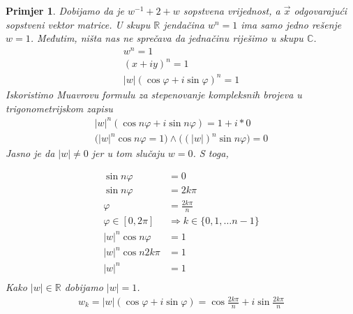 \documentclass[11pt]{article}
\newtheorem{example}{Primjer}
\begin{document}
\begin{example}
	Dobijamo da je $w^{-1} + 2 + w$ sopstvena vrijednost, a $\vec{x}$ odgovarajući sopstveni vektor matrice.
	U skupu $\mathbb{R}$ jendačina $w^n = 1$ ima samo jedno rešenje $w=1$. Međutim, ništa nas ne sprečava 
    da jednačinu riješimo u skupu $\mathbb{C}$.
	\[
	\begin{split}
	w^n  = 1 \\
	(x + iy)^n = 1 \\
	|w|(\cos\varphi + i \sin \varphi)^n = 1
	\end{split}
	\]
	Iskoristimo Muavrovu formulu za stepenovanje kompleksnih brojeva u trigonometrijskom zapisu
	\[
		\begin{split}
			|w|^n (\cos n\varphi + i\sin n\varphi)  = 1 + i * 0 \\
			\big(|w|^n \cos n \varphi = 1 \big) \land \big((|w|)^n \sin n \varphi\big)  = 0  
		\end{split}
		\]
		Jasno je da $|w| \neq 0$ jer u tom slučaju $w=0$. S toga, 
	
	\[
	\begin{split}
		\sin n \varphi &= 0 \\
		\sin n \varphi &= 2 k \pi \\
		\varphi &= \frac{2 k \pi}{n} \\
		\varphi \in [0,2\pi] &\Rightarrow k \in \{0,1, \dots n-1\} \\
		|w|^n \cos n \varphi & = 1 \\
		|w|^n \cos n 2 k \pi & = 1 \\
		|w|^n  & = 1 \\
	\end{split}
	\]
	Kako $|w| \in \mathbb{R}$ dobijamo $|w|=1$.
	\[
	\begin{split}
		w_k = |w| (\cos \varphi + i \sin \varphi) = \cos \frac{2 k \pi}{n} + i \sin \frac{2 k \pi}{n}
	\end{split}
	\]


\end{example}
\end{document}
